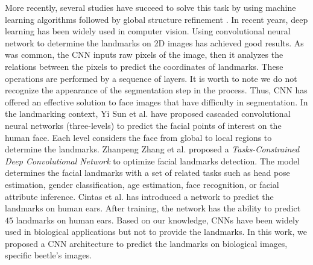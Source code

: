 \documentclass[review]{elsarticle}
\begin{document}

More recently, several studies have succeed to solve this task by using machine learning algorithms followed by global structure refinement \cite{ibragimov2012game, donner2013global, vandaele2018landmark}. In recent years, deep learning has been widely used in computer vision. Using convolutional neural network to determine the landmarks on 2D images has achieved good results. As was common, the CNN inputs raw pixels of the image, then it analyzes the relations between the pixels to predict the coordinates of landmarks. These operations are performed by a sequence of layers. It is worth to note we do not recognize the appearance of the segmentation step in the process. Thus, CNN has offered an effective solution to face images that have difficulty in segmentation. In the landmarking context, Yi Sun et al. \cite{sun2013deep} have proposed cascaded convolutional neural networks (three-levels) to predict the facial points of interest on the human face. Each level considers the face from global to local regions to determine the landmarks. Zhanpeng Zhang et al. \cite{zhang2014facial} proposed a \textit{Tasks-Constrained Deep Convolutional Network} to optimize facial landmarks detection. The model determines the facial landmarks with a set of related tasks such as head pose estimation, gender classification, age estimation, face recognition, or facial attribute inference. Cintas et al. \cite{cintas2016automatic} has introduced a network to predict the landmarks on human ears. After training, the network has the ability to predict $45$ landmarks on human ears. Based on our knowledge, CNNs have been widely used in biological applications but not to provide the landmarks. In this work, we proposed a CNN architecture to predict the landmarks on biological images, specific beetle's images.
\end{document}
